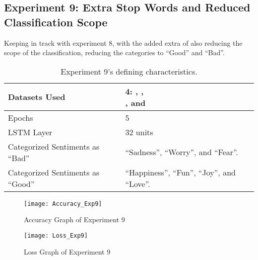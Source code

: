 \subsection{Experiment 9: Extra Stop Words and Reduced Classification Scope}
\label{exp9}
Keeping in track with experiment 8, with the added extra of also reducing the scope of the classification, reducing the categories to ``Good'' and ``Bad''.
\begin{table}[!h]
	\caption{Experiment 9's defining characteristics.}
	\vspace{0.5cm}
	\centering
	\begin{tabular}[t]{|l|l|}
	\hline
		Datasets Used & \makecell{4: \citet{d1}, \citet{d2},\\ \citet{d3}, and \citet{d4}}
	\\ \hline
		Epochs & 5
	\\ \hline
		LSTM Layer & 32 units
	\\ \hline
		Categorized Sentiments as ``Bad'' & ``Sadness'', ``Worry'', and ``Fear''.
	\\ \hline	
		Categorized Sentiments as ``Good'' & ``Happiness'', ``Fun'', ``Joy'', and ``Love''.
	\\ \hline
	\end{tabular}
\end{table}


\begin{figure}[!h]
	\centering
	\texttt{[image: Accuracy\_Exp9]}
	\caption{Accuracy Graph of Experiment 9}
	\label{fig:accuracy_exp9}
	\texttt{[image: Loss\_Exp9]}
	\caption{Loss Graph of Experiment 9}
	\label{fig:loss_exp9}
\end{figure}
\pagebreak

